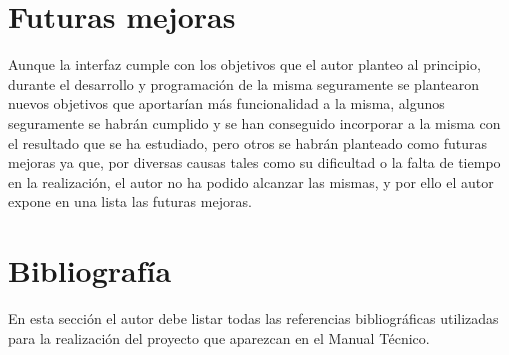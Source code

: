 
\section{Futuras mejoras}

Aunque la interfaz cumple con los objetivos que el autor planteo al principio,
durante el desarrollo y programación de la misma seguramente se  plantearon nuevos objetivos que aportarían más funcionalidad a la misma, algunos seguramente se habrán cumplido y se han conseguido incorporar a la misma con el resultado que se ha estudiado, pero otros se habrán planteado como futuras mejoras ya que, por diversas causas tales como su dificultad o la falta de tiempo en la realización, el autor no ha podido alcanzar las mismas, y por ello el autor expone en una lista las futuras mejoras.

\hspace{15px}


\section{Bibliografía}
En esta sección el autor debe listar todas las referencias bibliográficas
utilizadas para la realización del proyecto que aparezcan en el Manual Técnico.

